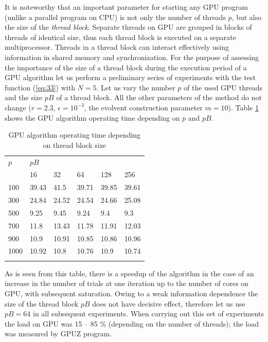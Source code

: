 \documentclass[smallcondensed]{svjour3}     %
\begin{document}
It is noteworthy that an important parameter for starting any GPU program (unlike a parallel program on CPU) is not only the number of threads $p$, but also the size of the \textit{thread block}. Separate threads on GPU are grouped in blocks of threads of identical size, thus each thread block is executed on a separate multiprocessor. Threads in a thread block can interact effectively using information in shared memory and synchronization. For the purpose of assessing the importance of the size of a thread block during the execution period of a GPU algorithm let us perform a preliminary series of experiments with the test function (\ref{eq:33}) with $N=5$. Let us vary the number $p$ of the used GPU threads and the size $pB$ of a thread block. All the other parameters of the method do not change ($r=2.3$, $\epsilon = 10^{-3}$, the evolvent construction parameter $m=10$). Table \ref{tab:2} shows the GPU algorithm operating time depending on $p$ and $pB$.
\begin{table}
	\caption{GPU algorithm operating time depending on thread block size}
	\label{tab:2}
	\center
	\begin{tabular}{llllll}
		\hline\noalign{\smallskip}
		$p$ & \multicolumn{5}{l}{ \hfil $pB$ \hfil } \\
		\noalign{\smallskip} \cline{2-6} \noalign{\smallskip}
		 & 16 & 32 & 64 & 128 & 256  \\
		\noalign{\smallskip} \hline \noalign{\smallskip}
		100 &	39.43 &	41.5 &	39.71 &	39.85 &	39.61 \\
		300 &	24.84 &	24.52 &	24.54 &	24.66 &	25.08 \\
		500 &	9.25 &	9.45 &	9.24 &	9.4 &	9.3\\
		700 &	11.8 &	13.43 &	11.78 &	11.91 &	12.03\\
		900 &	10.9 &	10.91 &	10.85 &	10.86 &	10.96\\
		1000 &	10.92 &	10.8 &	10.76 &	10.9 &	10.74\\
		\noalign{\smallskip}\hline
	\end{tabular}
\end{table}

As is seen from this table, there is a speedup of the algorithm in the case of an increase in the number of trials at one iteration up to the number of cores on GPU, with subsequent saturation. Owing to a weak information dependence the size of the thread block $pB$ does not have decisive effect, therefore let us use $pB=64$ in all subsequent experiments. When carrying out this set of experiments the load on GPU was 15 -- 85 \% (depending on the number of threads); the load was measured by GPUZ program.
\end{document}
